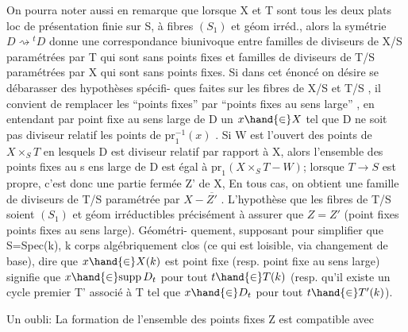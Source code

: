 
On pourra noter aussi en remarque que lorsque X et T sont tous les
deux plats loc de présentation finie sur S, à fibres $(S_1)$ et géom irréd.,
alors la symétrie $D \rightsquigarrow {}^{t}D$ donne une correspondance biunivoque entre
familles de diviseurs de X/S paramétrées par T qui sont sans points fixes
et familles de diviseurs de T/S paramétrées par X qui sont sans points
fixes. Si dans cet énoncé on désire se débarasser des hypothèses spécifi-%
ques faites sur les fibres de X/S et T/S , il convient de remplacer
les ``points fixes'' par ``points fixes au sens large'' , en entendant par
point fixe au sens large de D un $x \hand{\in} X$ tel que D ne soit pas diviseur
 relatif   les points de $\mathrm{pr}_1^{-1}(x)$ . Si W est l'ouvert des
points de $X\times_S T$ en lesquels D est  diviseur  relatif par
rapport à X, alors l'ensemble des points fixes au s ens large de D est
 égal à $\mathrm{pr}_1(X\times_S T - W)$; lorsque $T \to S$ est propre, c'est donc
une partie fermée Z' de X,  En tous cas, on obtient une
famille de diviseurs de T/S paramétrée par $X-\overline{Z'}$ . L'hypothèse que les
fibres de T/S soient $(S_1)$ et géom irréductibles   précisément à
assurer que $Z=Z'$ (point fixes \unsure{$=$} points fixes au sens large). Géométri-%
quement, supposant pour simplifier que S=Spec(k), k corps algébriquement
clos (ce qui est loisible,  via changement de base), dire que $x \hand{\in} X(k)$
est point fixe (resp. point fixe au sens large) signifie que $x \hand{\in} \mathrm{supp}\, D_t$
pour tout $t \hand{\in} T(k)$ (resp. qu'il existe un cycle premier T' associé à T
tel que $x \hand{\in} D_t$ pour tout $t \hand{\in} T'(k)$).

 \margin{$\|$} Un oubli: 
La formation de l'ensemble des points fixes Z est compatible avec

